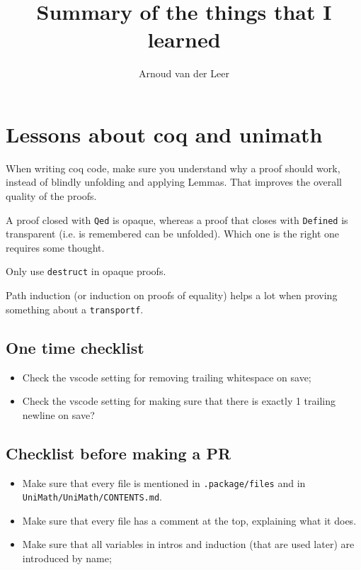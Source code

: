 \documentclass{amsbook}
\title{Summary of the things that I learned}
\author{Arnoud van der Leer}
\theoremstyle{definition}
\begin{document}
  \maketitle

  \chapter{Lessons about coq and unimath}
  When writing coq code, make sure you understand why a proof should work, instead of blindly unfolding and applying Lemmas. That improves the overall quality of the proofs.

  A proof closed with \texttt{Qed} is opaque, whereas a proof that closes with \texttt{Defined} is transparent (i.e. is remembered can be unfolded). Which one is the right one requires some thought.

  Only use \texttt{destruct} in opaque proofs.

  Path induction (or induction on proofs of equality) helps a lot when proving something about a \texttt{transportf}.

  \section{One time checklist}
  \begin{itemize}
    \item Check the vscode setting for removing trailing whitespace on save;
    \item Check the vscode setting for making sure that there is exactly 1 trailing newline on save?
  \end{itemize}

  \section{Checklist before making a PR}
  \begin{itemize}
    \item Make sure that every file is mentioned in \texttt{.package/files} and in \texttt{UniMath/UniMath/CONTENTS.md}.
    \item Make sure that every file has a comment at the top, explaining what it does.
    \item Make sure that all variables in intros and induction (that are used later) are introduced by name;
  \end{itemize}
\end{document}
